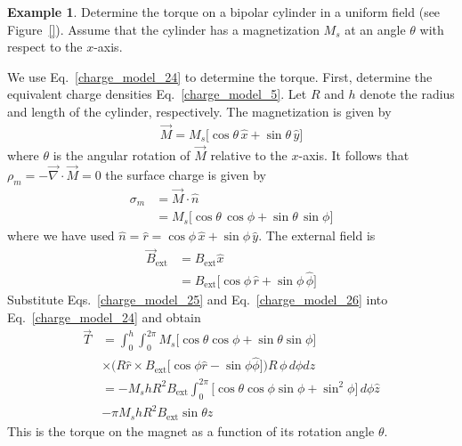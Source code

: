 \documentclass[11pt,a4paper,oneside]{book}
\numberwithin{equation}{section}
\theoremstyle{it}
\theoremstyle{definition}
\newtheorem{example}{Example}[section]
\begin{document}
\begin{example}
	Determine the torque on a bipolar cylinder in a uniform field (see Figure~\ref{}).  Assume that the cylinder has a magnetization $M_s$ at an angle $\theta$ with respect to the $x$-axis.
	
	We use Eq.~\eqref{charge_model_24} to determine the torque. First, determine the equivalent charge densities Eq.~\eqref{charge_model_5}. Let $R$ and $h$ denote the radius and length of the cylinder, respectively. The magnetization is given by
	\begin{equation*}\label{}
		{\begin{aligned}
				\vec{M} = M_s\Big[\cos\theta\,\hat{x}+\sin\theta\,\hat{y}\Big]
		\end{aligned}}
	\end{equation*} 
where $\theta$ is the angular rotation of $\vec{M}$ relative to the $x$-axis. It follows that $\rho_m=-\vec{\nabla}\cdot\vec{M}=0$ the surface charge is given by
	\begin{equation}\label{charge_model_25}
	{\begin{aligned}
			\sigma_m &=\vec{M}\cdot\hat{n} \\[6pt] &= M_s\Big[\cos\theta\,\cos\phi+\sin\theta\,\sin\phi\Big]
	\end{aligned}}
	\end{equation} 
where we have used $\hat{n}=\hat{r}=\cos\phi\,\hat{x}+\sin\phi\,\hat{y}$. The external field is
\begin{equation}\label{charge_model_26}
{\begin{aligned}
		\vec{B}_\text{ext} &=B_\text{ext}\hat{x} \\[6pt] 
		&= B_\text{ext}\Big[\cos\phi\,\hat{r}+\sin\phi\,\hat{\phi}\Big]
\end{aligned}}
\end{equation} 
Substitute Eqs.~\eqref{charge_model_25} and Eq.~\eqref{charge_model_26} into Eq.~\eqref{charge_model_24} and obtain
\begin{equation}\label{charge_model_27}
	{\begin{aligned}
			\vec{T} &= \int_{0}^{h} \int_{0}^{2\pi} M_s\Big[\cos\theta\cos\phi+\sin\theta\sin\phi\Big] \\[6pt]
			&\times\Big(R\hat{r} \times B_\text{ext} \Big[\cos\phi\hat{r}-\sin\phi\hat{\phi}\Big]\Big) R\,\phi\,d\phi dz  \\[6pt]
			&= -M_shR^2B_\text{ext}\int_{0}^{2\pi}\Big[\cos\theta\cos\phi\sin\phi+\sin^2\phi\Big]\,d\phi\hat{z} \\[6pt]
			&-\pi M_s h R^2 B_\text{ext}\sin\theta\hat{z}
	\end{aligned}}
\end{equation} 
This is the torque on the magnet as a function of its rotation angle $\theta$.
\end{example}
\end{document}
